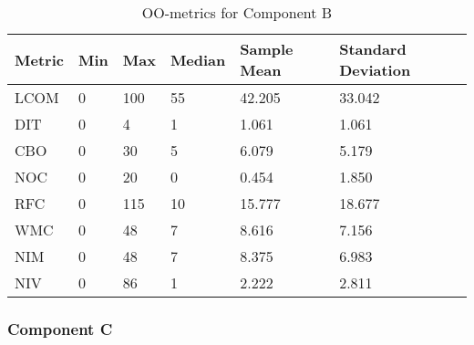 \begin{table}[]
\centering
\caption{OO-metrics for Component B}
\label{tab:oometrics-blc}
\begin{tabular}{|l|l|l|l|l|l|}
\hline
\textbf{Metric} & \textbf{Min} & \textbf{Max} & \textbf{Median} & \textbf{Sample Mean} & \textbf{Standard Deviation} \\ \hline
LCOM            & 0            & 100          & 55              & 42.205               & 33.042                      \\ \hline
DIT             & 0            & 4            & 1               & 1.061                & 1.061                       \\ \hline
CBO             & 0            & 30           & 5               & 6.079                & 5.179                       \\ \hline
NOC             & 0            & 20           & 0               & 0.454                & 1.850                       \\ \hline
RFC             & 0            & 115          & 10              & 15.777               & 18.677                      \\ \hline
WMC             & 0            & 48           & 7               & 8.616                & 7.156                       \\ \hline
NIM             & 0            & 48           & 7               & 8.375                & 6.983                       \\ \hline
NIV             & 0            & 86           & 1               & 2.222                & 2.811                       \\ \hline
\end{tabular}
\end{table}








\subsubsection{Component C}

